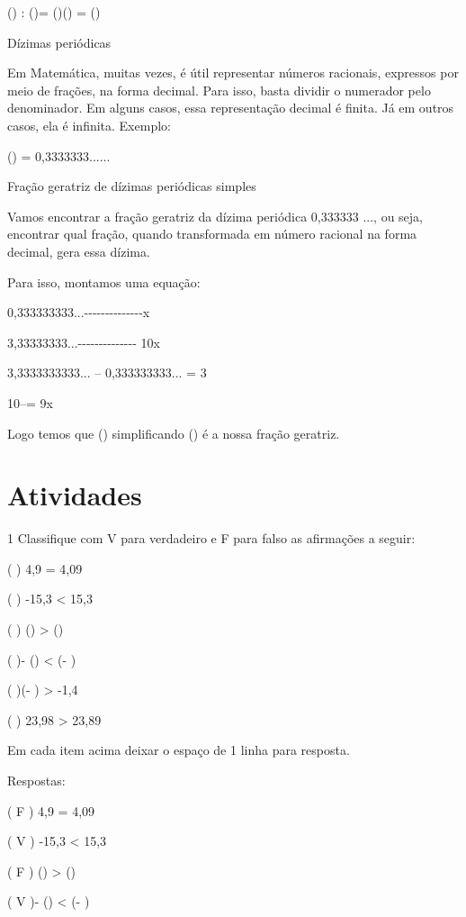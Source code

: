 () : ()= ()\times () =
()

Dízimas periódicas

Em Matemática, muitas vezes, é útil representar números racionais,
expressos por meio de frações, na forma decimal. Para isso, basta
dividir o numerador pelo denominador. Em alguns casos, essa
representação decimal é finita. Já em outros casos, ela é infinita.
Exemplo:

() = 0,3333333......

Fração geratriz de dízimas periódicas simples

Vamos encontrar a fração geratriz da dízima periódica 0,333333 ..., ou
seja, encontrar qual fração, quando transformada em número racional na
forma decimal, gera essa dízima.

Para isso, montamos uma equação:

0,333333333...-\/-\/-\/-\/-\/-\/-\/-\/-\/-\/-\/-\/-\/-x

3,33333333...-\/-\/-\/-\/-\/-\/-\/-\/-\/-\/-\/-\/-\/- 10x

3,3333333333... -- 0,333333333... = 3

10\times --\times = 9x

Logo temos que () simplificando () é a nossa
fração geratriz.

\section{Atividades}

\num{1} Classifique com V para verdadeiro e F para falso as afirmações a
seguir:

( ) 4,9 = 4,09

( ) -15,3 \textless{} 15,3

( ) () \textgreater{} ()

( )- () \textless{} (- )

( )(- ) \textgreater{} -1,4

( ) 23,98 \textgreater{} 23,89

Em cada item acima deixar o espaço de 1 linha para resposta.

Respostas:

( F ) 4,9 = 4,09

( V ) -15,3 \textless{} 15,3

( F ) () \textgreater{} ()

( V )- () \textless{} (- )

